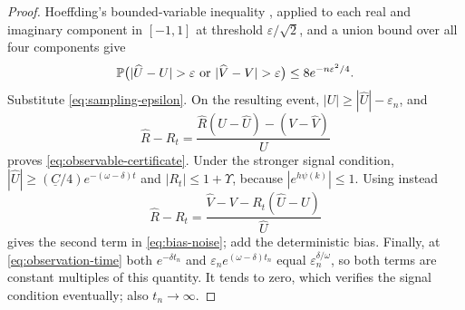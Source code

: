 \begin{proof}
Hoeffding's bounded-variable inequality \citep{Hoeffding1963}, applied
to each real and imaginary component in $[-1,1]$ at threshold
$\varepsilon/\sqrt2$, and a union bound over all four components give
\[
 \Prob\bigl(|\widehat U-U|>\varepsilon
             \text{ or }|\widehat V-V|>\varepsilon\bigr)
 \leq8e^{-n\varepsilon^2/4}.
\]
Substitute \eqref{eq:sampling-epsilon}. On the resulting event,
$|U|\geq|\widehat U|-\varepsilon_n$, and
\[
 \widehat R-R_t
 =\frac{\widehat R(U-\widehat U)-(V-\widehat V)}U
\]
proves \eqref{eq:observable-certificate}. Under the stronger signal
condition, $|\widehat U|\geq(\underline C/4)e^{-(\omega-\delta)t}$ and
$|R_t|\leq1+\Upsilon$, because $|e^{h\psi(k)}|\leq1$.
Using instead
\[
 \widehat R-R_t
 =\frac{\widehat V-V-R_t(\widehat U-U)}{\widehat U}
\]
gives the second term in \eqref{eq:bias-noise}; add the deterministic
bias. Finally, at \eqref{eq:observation-time} both
$e^{-\delta t_n}$ and $\varepsilon_ne^{(\omega-\delta)t_n}$ equal
$\varepsilon_n^{\delta/\omega}$, so both terms are constant multiples of
this quantity. It tends to zero, which verifies the signal condition
eventually; also $t_n\to\infty$.
\end{proof}

